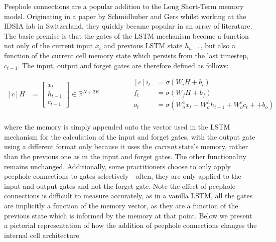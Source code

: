 \documentclass{article} %
\begin{document}
Peephole connections are a popular addition to the Long Short-Term memory model\cite{peepholeconnections}. Originating in a paper by Schmidhuber and Gers whilst working at the IDSIA lab in Switzerland, they quickly became popular in an array of literature. The basic premise is that the gates of the LSTM mechanism become a function not only of the current input $x_{t}$ and previous LSTM state $h_{h-1}$, but also a function of the current cell memory state which persists from the last timestep,  $c_{t-1}$. The input, output and forget gates are therefore defined as follows:

\begin{equation}
\begin{aligned}[c]
 H &= \left[ \begin{array}{cc}
         x_{t}  \\
         h_{t-1} \\
         c_{t-1}
    \end{array} \right] \in \mathbb{R}^{N+2K} \\
\end{aligned}
\qquad \qquad
    \begin{aligned}[c]
    i_{t} &= \sigma(W_{i}H + b_{i})\\
    f_{t} &= \sigma(W_{f}H + b_{f})\\
    o_{t} &= \sigma(W_{o}^{x}x_{t} + W_{o}^{h}h_{t-1} + W_{o}^{c}c_{t} +  + b_{o})\\
    \end{aligned}
\end{equation}

where the memory is simply appended onto the vector used in the LSTM mechanism for the calculation of the input and forget gates, with the output gate using a different format only because it uses the {\it current} state's memory, rather than the previous one as in the input and forget gates. The other functionality remains unchanged. Additionally, some practitioners choose to only apply peephole connections to gates selectively - often, they are only applied to the input and output gates and not the forget gate. Note the effect of peephole connections is difficult to measure accurately, as in a vanilla LSTM, all the gates are implicitly a function of the memory vector, as they are a function of the previous state which is informed by the memory at that point. Below we present a pictorial representation of how the addition of peephole connections changes the internal cell architecture.
\end{document}
